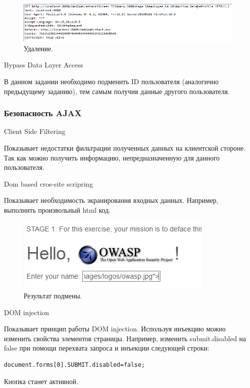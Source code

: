 \documentclass[10pt,a4paper]{article}
\begin{document}
\begin{figure}[h]
\centering
\includegraphics[width=\textwidth]{deleteProfile}
\caption{Удаление.}
\end{figure}

Bypass Data Layer Access

В данном задании необходимо подменить ID пользователя (аналогично предыдущему заданию), тем самым получив данные другого пользователя.

\subsubsection{Безопасность AJAX}

Client Side Filtering

Показывает недостатки фильтрации полученных данных на клиентской стороне. Так как можно получить информацию, непредназначенную для данного пользователя. 

Dom based cros-site scripring

Показывает необходимость экранирования входных данных. Например, выполнить произвольный html код.

\begin{figure}[h]
\centering
\includegraphics[width=\textwidth]{ajax_mg}
\caption{Результат подмены.}
\end{figure}

DOM injection

Показывает принцип работы DOM injection. Используя инъекцию можно изменить свойства элементов страницы. Например, изменить submit.disabled на false при помощи перехвата запроса и инъекции следующей строки:

\begin{verbatim}
document.forms[0].SUBMIT.disabled=false;
\end{verbatim}
Кнопка станет активной.
\end{document}
